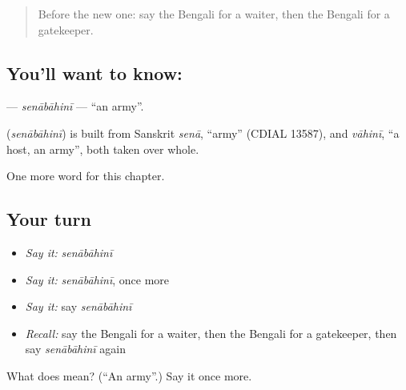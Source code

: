 \label{lesson:BN-C261-senabahini}



\begin{quote}
Before the new one: say the Bengali for a waiter, then the Bengali for a gatekeeper.
\end{quote}

\subsection*{You'll want to know: }
\textbf{} — \emph{senābāhinī} — \textquotedblleft{}an army\textquotedblright{}.

\begin{cousinweb}
\textbf{} (\emph{senābāhinī}) is built from Sanskrit \emph{senā}, \textquotedblleft{}army\textquotedblright{} (CDIAL 13587), and \emph{vāhinī}, \textquotedblleft{}a host, an army\textquotedblright{}, both taken over whole.
\end{cousinweb}

\begin{grammarlens}[title={What you've built}]
One more word for this chapter.
\end{grammarlens}

\subsection*{Your turn}
\begin{itemize}
\raggedright
  \item \emph{Say it:} \emph{senābāhinī}
  \item \emph{Say it:} \emph{senābāhinī}, once more
  \item \emph{Say it:} say \emph{senābāhinī}
  \item \emph{Recall:} say the Bengali for a waiter, then the Bengali for a gatekeeper, then say \emph{senābāhinī} again
\end{itemize}

\begin{tcolorbox}[breakable,colback=teal!4,colframe=teal!35!black,title={Before you move on}]
What does  mean? (\textquotedblleft{}An army\textquotedblright{}.) Say it once more.
\end{tcolorbox}
